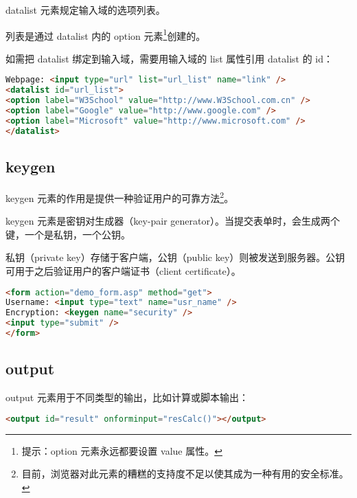 datalist 元素规定输入域的选项列表。

列表是通过 datalist 内的 option 元素\footnote{提示：option 元素永远都要设置 value 属性。}创建的。

如需把 datalist 绑定到输入域，需要用输入域的 list 属性引用 datalist 的 id：

\begin{lstlisting}[language=HTML]
Webpage: <input type="url" list="url_list" name="link" />
<datalist id="url_list">
<option label="W3School" value="http://www.W3School.com.cn" />
<option label="Google" value="http://www.google.com" />
<option label="Microsoft" value="http://www.microsoft.com" />
</datalist>
\end{lstlisting}






\subsection{keygen}

keygen 元素的作用是提供一种验证用户的可靠方法\footnote{目前，浏览器对此元素的糟糕的支持度不足以使其成为一种有用的安全标准。}。

keygen 元素是密钥对生成器（key-pair generator）。当提交表单时，会生成两个键，一个是私钥，一个公钥。

私钥（private key）存储于客户端，公钥（public key）则被发送到服务器。公钥可用于之后验证用户的客户端证书（client certificate）。

\begin{lstlisting}[language=HTML]
<form action="demo_form.asp" method="get">
Username: <input type="text" name="usr_name" />
Encryption: <keygen name="security" />
<input type="submit" />
</form>
\end{lstlisting}


\subsection{output}


output 元素用于不同类型的输出，比如计算或脚本输出：

\begin{lstlisting}[language=HTML]
<output id="result" onforminput="resCalc()"></output>
\end{lstlisting}


